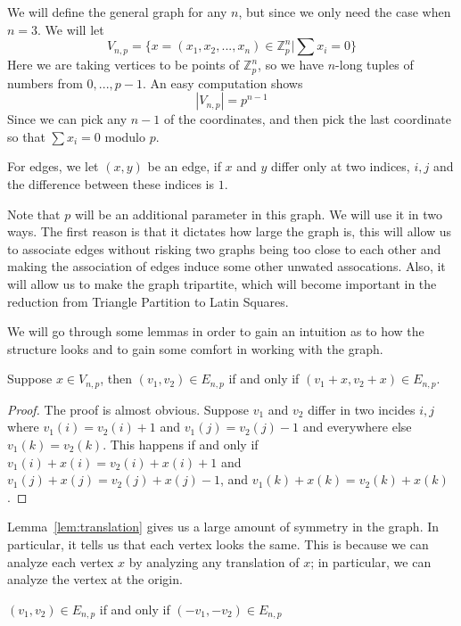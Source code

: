 \documentclass[runningheads,a4paper]{llncs}
\begin{document}
We will define the general graph for any $n$, but since we only need the case when $n=3$. We will let 
\[ V_{n,p} = \{ x = (x_1, x_2, ..., x_n) \in \mathbb{Z}_p^n | \sum x_i = 0 \} \]
Here we are taking vertices to be points of $\mathbb{Z}_p^n$, so we have $n$-long tuples of numbers from $0, ..., p-1$. An easy computation shows
\[ |V_{n,p}| = p^{n-1} \]
Since we can pick any $n-1$ of the coordinates, and then pick the last coordinate so that $\sum x_i = 0$ modulo $p$.

For edges, we let $(x,y)$ be an edge, if $x$ and $y$ differ only at two indices, $i,j$ and the difference between these indices is $1$. 

Note that $p$ will be an additional parameter in this graph. We will use it in two ways. The first reason is that it dictates how large the graph is, this will allow us to associate edges without risking two graphs being too close to each other and making the association of edges induce some other unwated assocations. Also, it will allow us to make the graph tripartite, which will become important in the reduction from Triangle Partition to Latin Squares.

We will go through some lemmas in order to gain an intuition as to how the structure looks and to gain some comfort in working with the graph. 

\begin{lemma}
\label{lem:translation}
Suppose $x \in V_{n,p}$, then $(v_1, v_2) \in E_{n,p}$ if and only if $(v_1+x, v_2+x) \in E_{n,p}$.
\end{lemma}

\begin{proof}
The proof is almost obvious. Suppose $v_1$ and $v_2$ differ in two incides $i,j$ where $v_1(i) = v_2(i) + 1$ and $v_1(j) = v_2(j) - 1$ and everywhere else $v_1(k) = v_2(k)$. This happens if and only if $v_1(i) + x(i) = v_2(i) + x(i) + 1$ and $v_1(j) + x(j) = v_2(j) + x(j) - 1$, and $v_1(k) + x(k) = v_2(k) + x(k)$. 
\end{proof}

Lemma~\ref{lem:translation} gives us a large amount of symmetry in the graph. In particular, it tells us that each vertex looks the same. This is because we can analyze each vertex $x$ by analyzing any translation of $x$; in particular, we can analyze the vertex at the origin. 

\begin{lemma}
\label{lem:flip}
$(v_1, v_2) \in E_{n,p}$ if and only if $(-v_1, -v_2) \in E_{n,p}$
\end{lemma}
\end{document}
